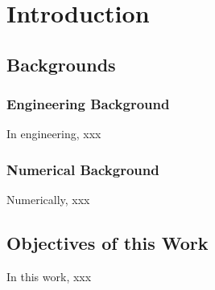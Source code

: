 \chapter{Introduction}
\label{ch:chap1}


\section{Backgrounds}

\subsection{Engineering Background}
In engineering, xxx \cite{abeele-2008}

\subsection{Numerical Background}

Numerically, xxx


\section{Objectives of this Work}
In this work, xxx
